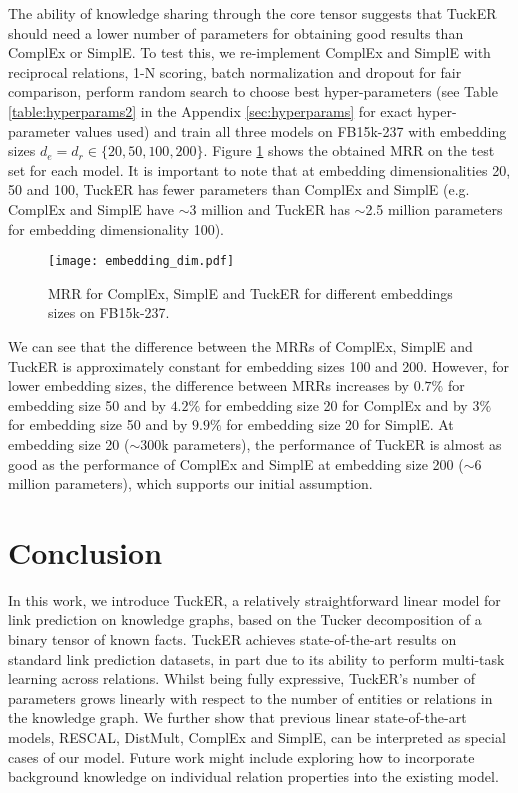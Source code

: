 \documentclass[11pt,a4paper]{article}
\begin{document}
The ability of knowledge sharing through the core tensor suggests that TuckER should need a lower number of parameters for obtaining good results than ComplEx or SimplE. To test this, we re-implement ComplEx and SimplE with reciprocal relations, 1-N scoring, batch normalization and dropout for fair comparison, perform random search to choose best hyper-parameters (see Table \ref{table:hyperparams2} in the Appendix \ref{sec:hyperparams} for exact hyper-parameter values used) and train all three models on FB15k-237 with embedding sizes $d_e = d_r \in\{20, 50, 100, 200\}$. Figure \ref{fig:results} shows the obtained MRR on the test set for each model. It is important to note that at embedding dimensionalities 20, 50 and 100, TuckER has fewer parameters than ComplEx and SimplE (e.g. ComplEx and SimplE have $\sim$3 million and TuckER has $\sim$2.5 million parameters for embedding dimensionality 100).

\begin{figure}[!htb]
\centering
\texttt{[image: embedding\_dim.pdf]}
\caption{MRR for ComplEx, SimplE and TuckER for different embeddings sizes on FB15k-237.}
\label{fig:results}
\end{figure}

 We can see that the difference between the MRRs of ComplEx, SimplE and TuckER is approximately constant for embedding sizes 100 and 200. However, for lower embedding sizes, the difference between MRRs increases by $0.7\%$ for embedding size 50 and by $4.2\%$ for embedding size 20 for ComplEx and by $3\%$ for embedding size 50 and by $9.9\%$ for embedding size 20 for SimplE. At embedding size 20 ($\sim$300k parameters), the performance of TuckER is almost as good as the performance of ComplEx and SimplE at embedding size 200 ($\sim$6 million parameters), which supports our initial assumption.

\section{Conclusion}
\vspace{-0.1cm}

In this work, we introduce TuckER, a relatively straightforward linear model for link prediction on knowledge graphs, based on the Tucker decomposition of a binary tensor of known facts. TuckER achieves state-of-the-art results on standard link prediction datasets, in part due to its ability to perform multi-task learning across relations. Whilst being fully expressive, TuckER's number of parameters grows linearly with respect to the number of entities or relations in the knowledge graph. We further show that previous linear state-of-the-art models, RESCAL, DistMult, ComplEx and SimplE, can be interpreted as special cases of our model. Future work might include exploring how to incorporate background knowledge on individual relation properties into the existing model.
\end{document}
